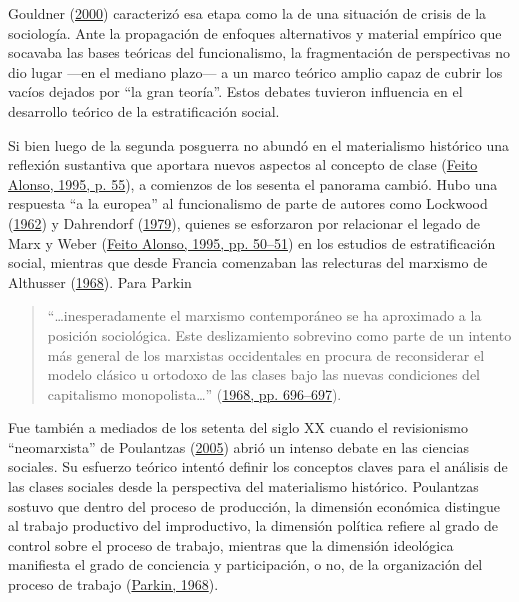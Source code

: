 \documentclass[
]{article}
\begin{document}
Gouldner (\protect\hyperlink{ref-Gouldner2000}{2000}) caracterizó esa etapa como la de una situación de crisis de la sociología. Ante la propagación de enfoques alternativos y material empírico que socavaba las bases teóricas del funcionalismo, la fragmentación de perspectivas no dio lugar ---en el mediano plazo--- a un marco teórico amplio capaz de cubrir los vacíos dejados por ``la gran teoría''. Estos debates tuvieron influencia en el desarrollo teórico de la estratificación social.

Si bien luego de la segunda posguerra no abundó en el materialismo histórico una reflexión sustantiva que aportara nuevos aspectos al concepto de clase (\protect\hyperlink{ref-FeitoAlonso1995}{Feito Alonso, 1995, p. 55}), a comienzos de los sesenta el panorama cambió. Hubo una respuesta ``a la europea'' al funcionalismo de parte de autores como Lockwood (\protect\hyperlink{ref-Lockwood1962}{1962}) y Dahrendorf (\protect\hyperlink{ref-Dahrendorf1979}{1979}), quienes se esforzaron por relacionar el legado de Marx y Weber (\protect\hyperlink{ref-FeitoAlonso1995}{Feito Alonso, 1995, pp. 50--51}) en los estudios de estratificación social, mientras que desde Francia comenzaban las relecturas del marxismo de Althusser (\protect\hyperlink{ref-Althusser1968}{1968}). Para Parkin

\begin{quote}
``\ldots inesperadamente el marxismo contemporáneo se ha aproximado a la posición sociológica. Este deslizamiento sobrevino como parte de un intento más general de los marxistas occidentales en procura de reconsiderar el modelo clásico u ortodoxo de las clases bajo las nuevas condiciones del capitalismo monopolista\ldots{}'' (\protect\hyperlink{ref-Parkin1968}{1968, pp. 696--697}).
\end{quote}

Fue también a mediados de los setenta del siglo XX cuando el revisionismo ``neomarxista'' de Poulantzas (\protect\hyperlink{ref-Poulantzas2005}{2005}) abrió un intenso debate en las ciencias sociales. Su esfuerzo teórico intentó definir los conceptos claves para el análisis de las clases sociales desde la perspectiva del materialismo histórico. Poulantzas sostuvo que dentro del proceso de producción, la dimensión económica distingue al trabajo productivo del improductivo, la dimensión política refiere al grado de control sobre el proceso de trabajo, mientras que la dimensión ideológica manifiesta el grado de conciencia y participación, o no, de la organización del proceso de trabajo (\protect\hyperlink{ref-Parkin1968}{Parkin, 1968}).
\end{document}
